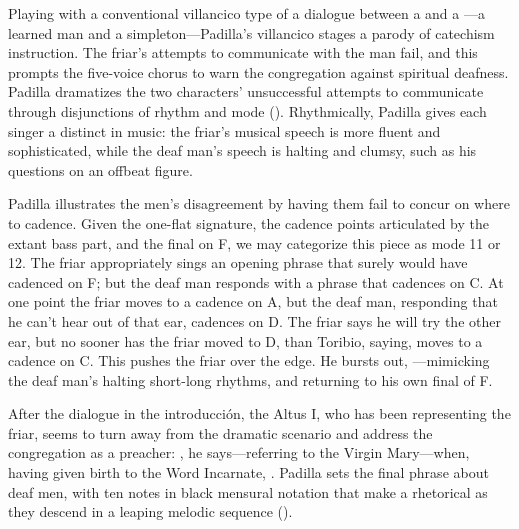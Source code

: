 
Playing with a conventional villancico type of a dialogue between a  and a ---a learned man and a simpleton---Padilla's villancico stages a parody of catechism instruction.
The friar's attempts to communicate with the  man fail, and this prompts the five-voice chorus to warn the congregation against spiritual deafness.
Padilla dramatizes the two characters' unsuccessful attempts to communicate through disjunctions of rhythm and mode ().
Rhythmically, Padilla gives each singer a distinct  in music: the friar's musical speech is more fluent and sophisticated, while the deaf man's speech is halting and clumsy, such as his questions  on an offbeat figure.

\begin{exmusic}
  \caption{Padilla, , introducción, , extant parts (missing Tenor I, Bassus I)}
  \label{exmusic:Padilla-Sordo-intro}
\end{exmusic}

Padilla illustrates the men's disagreement by having them fail to concur on where to cadence.
Given the one-flat  signature, the cadence points articulated by the extant bass part, and the final on F, we may categorize this piece as mode 11 or 12.
The friar appropriately sings an opening phrase that surely would have cadenced on F; but the deaf man responds with a phrase that cadences on C.
At one point the friar moves to a cadence on A, but the deaf man, responding that he can't hear out of that ear, cadences on D.
The friar says he will try the other ear, but no sooner has the friar moved to D, than Toribio, saying,  moves to a cadence on C.
This pushes the friar over the edge.
He bursts out, ---mimicking the deaf man's halting short-long rhythms, and returning to his own final of F.

After the dialogue in the introducción, the Altus I, who has been representing the friar, seems to turn away from the dramatic scenario and address the congregation as a preacher: , he says---referring to the Virgin Mary---when, having given birth to the Word Incarnate, .
Padilla sets the final phrase about deaf men, with ten notes in black mensural notation that make a rhetorical  as they descend in a leaping melodic sequence ().


